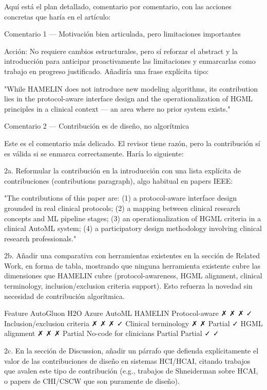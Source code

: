 Aquí está el plan detallado, comentario por comentario, con las acciones concretas que haría en el artículo:

Comentario 1 — Motivación bien articulada, pero limitaciones importantes

Acción: No requiere cambios estructurales, pero sí reforzar el abstract y la introducción para anticipar proactivamente las limitaciones y enmarcarlas como trabajo en progreso justificado. Añadiría una frase explícita tipo:

"While HAMELIN does not introduce new modeling algorithms, its contribution lies in the protocol-aware interface design and the operationalization of HGML principles in a clinical context — an area where no prior system exists."

Comentario 2 — Contribución es de diseño, no algorítmica

Este es el comentario más delicado. El revisor tiene razón, pero la contribución sí es válida si se enmarca correctamente. Haría lo siguiente:

2a. Reformular la contribución en la introducción con una lista explícita de contribuciones (contributions paragraph), algo habitual en papers IEEE:

"The contributions of this paper are: (1) a protocol-aware interface design grounded in real clinical protocols; (2) a mapping between clinical research concepts and ML pipeline stages; (3) an operationalization of HGML criteria in a clinical AutoML system; (4) a participatory design methodology involving clinical research professionals."

2b. Añadir una comparativa con herramientas existentes en la sección de Related Work, en forma de tabla, mostrando que ninguna herramienta existente cubre las dimensiones que HAMELIN cubre (protocol-awareness, HGML alignment, clinical terminology, inclusion/exclusion criteria support). Esto refuerza la novedad sin necesidad de contribución algorítmica.

Feature	AutoGluon	H2O	Azure AutoML	HAMELIN
Protocol-aware	✗	✗	✗	✓
Inclusion/exclusion criteria	✗	✗	✗	✓
Clinical terminology	✗	✗	Partial	✓
HGML alignment	✗	✗	✗	Partial
No-code for clinicians	Partial	Partial	✓	✓

2c. En la sección de Discussion, añadir un párrafo que defienda explícitamente el valor de las contribuciones de diseño en sistemas HCI/HCAI, citando trabajos que avalen este tipo de contribución (e.g., trabajos de Shneiderman sobre HCAI, o papers de CHI/CSCW que son puramente de diseño).

